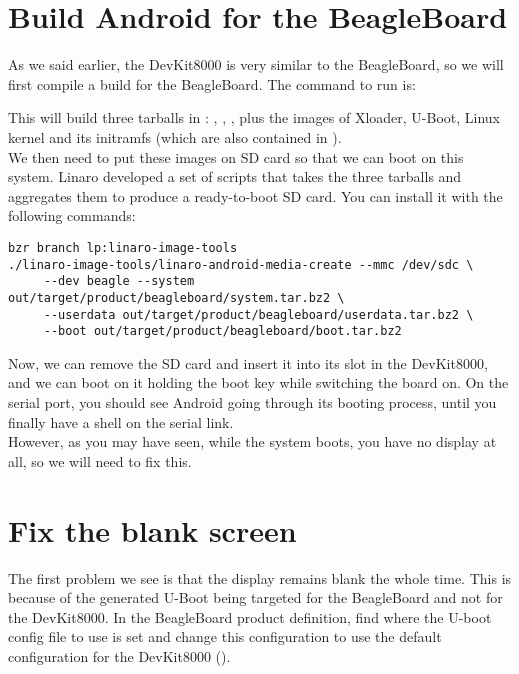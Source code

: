 \section{Build Android for the BeagleBoard}

As we said earlier, the DevKit8000 is very similar to the BeagleBoard, so we
will first compile a build for the BeagleBoard. The command to run is:\\

This will build three tarballs in :
, , , plus the images of Xloader,
U-Boot, Linux kernel and its initramfs (which are also contained in
).\\

We then need to put these images on SD card so that we can boot on this system.
Linaro developed a set of scripts that takes the three tarballs and aggregates
them to produce a ready-to-boot SD card. You can install it with the following
commands:

\begin{verbatim}
bzr branch lp:linaro-image-tools
./linaro-image-tools/linaro-android-media-create --mmc /dev/sdc \
     --dev beagle --system out/target/product/beagleboard/system.tar.bz2 \
     --userdata out/target/product/beagleboard/userdata.tar.bz2 \
     --boot out/target/product/beagleboard/boot.tar.bz2
\end{verbatim}

Now, we can remove the SD card and insert it into its slot in the DevKit8000,
and we can boot on it holding the boot key while switching the board on. On the
serial port, you should see Android going through its booting process, until
you finally have a shell on the serial link.\\

However, as you may have seen, while the system boots, you have no display at
all, so we will need to fix this.

\section{Fix the blank screen}

The first problem we see is that the display remains blank the whole time. This
is because of the generated U-Boot being targeted for the BeagleBoard and not
for the DevKit8000. In the BeagleBoard product definition, find where the U-boot
config file to use is set and change this configuration to use the default
configuration for the DevKit8000 (\code{devkit8000_config}).\\

